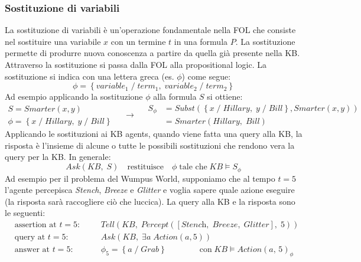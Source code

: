 \subsubsection*{Sostituzione di variabili}
La sostituzione di variabili è un'operazione fondamentale nella FOL che consiste nel sostituire una variabile \(x\) con un
termine \(t\) in una formula \(P\). La sostituzione permette di produrre nuova conoscenza a partire da quella già presente
nella KB. Attraverso la sostituzione si passa dalla FOL alla propositional logic. La sostituzione si indica con una lettera
greca (es. \(\phi\)) come segue:
\[\phi = \left\{ \textit{variable}_1 \; / \; \textit{term}_1, \; \textit{variable}_2 \; / \; \textit{term}_2 \right\}\]
Ad esempio applicando la sostituzione \(\phi\) alla formula \(S\) si ottiene:
\[\begin{array}{l}
	S = \textit{Smarter}(x, y) \\
	\phi = \left\{ x \; / \; \textit{Hillary}, \; y \; / \; \textit{Bill} \right\}
\end{array} \quad \rightarrow \quad
\begin{aligned}
	S_{\phi} &= \textit{Subst}( \left\{ x \; / \; \textit{Hillary}, \; y \; / \; \textit{Bill} \right\}, \textit{Smarter}(x,y)) \\
	&= \textit{Smarter} (\textit{Hillary}, \; \textit{Bill})
\end{aligned}\]
Applicando le sostituzioni ai KB agents, quando viene fatta una query alla KB, la risposta è l'insieme di alcune o tutte le
possibili sostituzioni che rendono vera la query per la KB.
In generale:
\[\textit{Ask}(\textit{KB}, \; S) \quad \text{restituisce} \quad \phi \; \text{tale che} \; \textit{KB} \models S_{\phi}\]
Ad esempio per il problema del Wumpus World, supponiamo che al tempo \(t=5\) l'agente percepisca \textit{Stench}, \textit{Breeze}
e \textit{Glitter} e voglia sapere quale azione eseguire (la risposta sarà raccogliere ciò che luccica). La query alla KB e la risposta sono le seguenti:
\begin{align*}
	&\text{assertion at \(t=5\)}: &\quad &\textit{Tell}(\textit{KB}, \; \textit{Percept}([\textit{Stench}, \; \textit{Breeze}, \; \textit{Glitter}], \; 5)) \\
	&\text{query at \(t=5\)}: &\quad &\textit{Ask}(\textit{KB}, \; \exists a \; \textit{Action}(a, 5)) \\
	&\text{answer at \(t=5\)}: &\quad &\phi_5 = \left\{ a \; / \; \textit{Grab} \right\} \qquad\qquad \text{con} \; \textit{KB} \models \textit{Action}(a, \, 5)_{\phi} \\
\end{align*}

